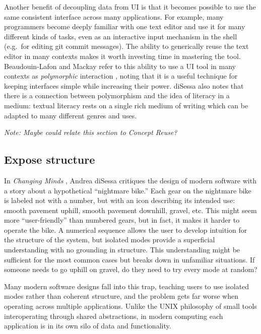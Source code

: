 \documentclass[english,submission]{programming}
\begin{document}
Another benefit of decoupling data from UI is that it becomes possible
to use the same consistent interface across many applications. For
example, many programmers become deeply familiar with one text editor
and use it for many different kinds of tasks, even as an interactive
input mechanism in the shell (e.g.~for editing git commit messages). The
ability to generically reuse the text editor in many contexts makes it
worth investing time in mastering the tool. Beaudouin-Lafon and Mackay
refer to this ability to use a UI tool in many contexts as
\emph{polymorphic} interaction \autocite{beaudouin-lafon2000}, noting
that it is a useful technique for keeping interfaces simple while
increasing their power. diSessa also \autocite{disessa2000} notes that
there is a connection between polymorphism and the idea of literacy in a
medium: textual literacy rests on a single rich medium of writing which
can be adapted to many different genres and uses.

\emph{Note: Maybe could relate this section to Concept Reuse?}

\hypertarget{expose-structure}{%
\subsection{Expose structure}\label{expose-structure}}

In \emph{Changing Minds} \autocite{disessa2000}, Andrea diSessa
critiques the design of modern software with a story about a
hypothetical ``nightmare bike.'' Each gear on the nightmare bike is
labeled not with a number, but with an icon describing its intended use:
smooth pavement uphill, smooth pavement downhill, gravel, etc. This
might seem more ``user-friendly'' than numbered gears, but in fact, it
makes it harder to operate the bike. A numerical sequence allows the
user to develop intuition for the structure of the system, but isolated
modes provide a superficial understanding with no grounding in
structure. This understanding might be sufficient for the most common
cases but breaks down in unfamiliar situations. If someone needs to go
uphill on gravel, do they need to try every mode at random?

Many modern software designs fall into this trap, teaching users to use
isolated modes rather than coherent structure, and the problem gets far
worse when operating across multiple applications. Unlike the UNIX
philosophy of small tools interoperating through shared abstractions, in
modern computing each application is in its own silo of data and
functionality.
\end{document}
